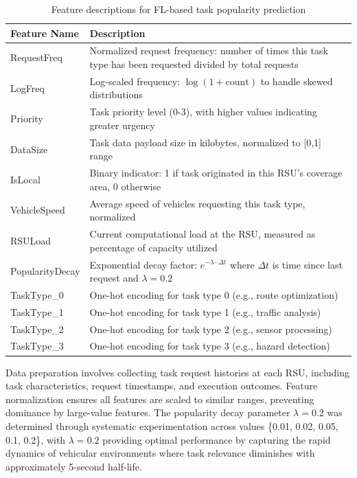 \begin{table}[t!]
    \centering
    \caption{Feature descriptions for FL-based task popularity prediction}
    \begin{footnotesize}
    \begin{tabularx}{\linewidth}{>{\centering\arraybackslash}m{2.5cm}|>{\RaggedRight\arraybackslash}X}
    \hline
    \rowcolor[gray]{0.9}
    \textbf{Feature Name} & \textbf{Description} \\
    \hline
    RequestFreq & Normalized request frequency: number of times this task type has been requested divided by total requests \\
    \hline
    LogFreq & Log-scaled frequency: $\log(1 + \text{count})$ to handle skewed distributions \\
    \hline
    Priority & Task priority level (0-3), with higher values indicating greater urgency \\
    \hline
    DataSize & Task data payload size in kilobytes, normalized to [0,1] range \\
    \hline
    IsLocal & Binary indicator: 1 if task originated in this RSU's coverage area, 0 otherwise \\
    \hline
    VehicleSpeed & Average speed of vehicles requesting this task type, normalized \\
    \hline
    RSULoad & Current computational load at the RSU, measured as percentage of capacity utilized \\
    \hline
    PopularityDecay & Exponential decay factor: $e^{-\lambda \cdot \Delta t}$ where $\Delta t$ is time since last request and $\lambda = 0.2$ \\
    \hline
    TaskType\_0 & One-hot encoding for task type 0 (e.g., route optimization) \\
    \hline
    TaskType\_1 & One-hot encoding for task type 1 (e.g., traffic analysis) \\
    \hline
    TaskType\_2 & One-hot encoding for task type 2 (e.g., sensor processing) \\
    \hline
    TaskType\_3 & One-hot encoding for task type 3 (e.g., hazard detection) \\
    \hline
    \end{tabularx}
    \end{footnotesize}
    \label{table:fl_feature_descriptions}
\end{table}

Data preparation involves collecting task request histories at each RSU, including task characteristics, request timestamps, and execution outcomes. Feature normalization ensures all features are scaled to similar ranges, preventing dominance by large-value features. The popularity decay parameter $\lambda = 0.2$ was determined through systematic experimentation across values \{0.01, 0.02, 0.05, 0.1, 0.2\}, with $\lambda = 0.2$ providing optimal performance by capturing the rapid dynamics of vehicular environments where task relevance diminishes with approximately 5-second half-life.

